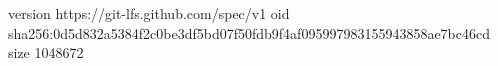 version https://git-lfs.github.com/spec/v1
oid sha256:0d5d832a5384f2c0be3df5bd07f50fdb9f4af095997983155943858ae7bc46cd
size 1048672
